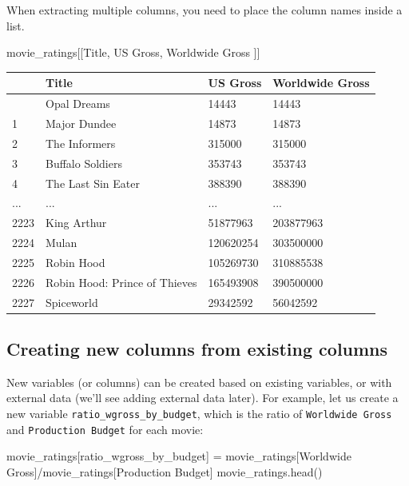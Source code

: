 \documentclass[
  letterpaper,
  DIV=11,
  numbers=noendperiod]{scrreprt}
\newenvironment{Shaded}{\begin{snugshade}}{\end{snugshade}}
\newcommand{\NormalTok}[1]{\textcolor[rgb]{0.00,0.23,0.31}{#1}}
\newcommand{\OperatorTok}[1]{\textcolor[rgb]{0.37,0.37,0.37}{#1}}
\newcommand{\StringTok}[1]{\textcolor[rgb]{0.13,0.47,0.30}{#1}}
\begin{document}
When extracting multiple columns, you need to place the column names
inside a list.

\begin{Shaded}
\begin{Highlighting}[]
\NormalTok{movie\_ratings[[}\StringTok{\textquotesingle{}Title\textquotesingle{}}\NormalTok{, }\StringTok{\textquotesingle{}US Gross\textquotesingle{}}\NormalTok{, }\StringTok{\textquotesingle{}Worldwide Gross\textquotesingle{}}\NormalTok{ ]]}
\end{Highlighting}
\end{Shaded}

\begin{longtable}[]{@{}llll@{}}
\toprule\noalign{}
& Title & US Gross & Worldwide Gross \\
\midrule\noalign{}
\endhead
\bottomrule\noalign{}
\endlastfoot
0 & Opal Dreams & 14443 & 14443 \\
1 & Major Dundee & 14873 & 14873 \\
2 & The Informers & 315000 & 315000 \\
3 & Buffalo Soldiers & 353743 & 353743 \\
4 & The Last Sin Eater & 388390 & 388390 \\
... & ... & ... & ... \\
2223 & King Arthur & 51877963 & 203877963 \\
2224 & Mulan & 120620254 & 303500000 \\
2225 & Robin Hood & 105269730 & 310885538 \\
2226 & Robin Hood: Prince of Thieves & 165493908 & 390500000 \\
2227 & Spiceworld & 29342592 & 56042592 \\
\end{longtable}

\hypertarget{creating-new-columns-from-existing-columns}{%
\subsection{Creating new columns from existing
columns}\label{creating-new-columns-from-existing-columns}}

New variables (or columns) can be created based on existing variables,
or with external data (we'll see adding external data later). For
example, let us create a new variable
\texttt{ratio\_wgross\_by\_budget}, which is the ratio of
\texttt{Worldwide\ Gross} and \texttt{Production\ Budget} for each
movie:

\begin{Shaded}
\begin{Highlighting}[]
\NormalTok{movie\_ratings[}\StringTok{\textquotesingle{}ratio\_wgross\_by\_budget\textquotesingle{}}\NormalTok{] }\OperatorTok{=}\NormalTok{ movie\_ratings[}\StringTok{\textquotesingle{}Worldwide Gross\textquotesingle{}}\NormalTok{]}\OperatorTok{/}\NormalTok{movie\_ratings[}\StringTok{\textquotesingle{}Production Budget\textquotesingle{}}\NormalTok{]}
\NormalTok{movie\_ratings.head()}
\end{Highlighting}
\end{Shaded}
\end{document}
